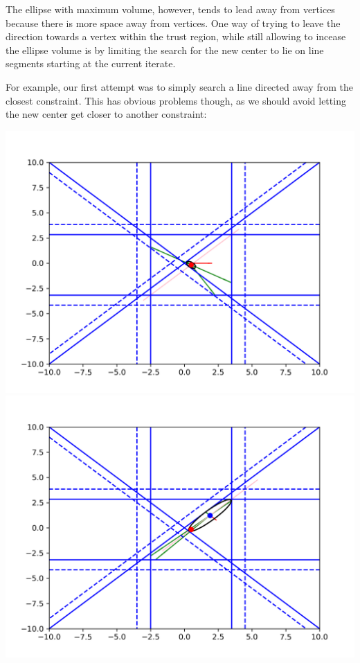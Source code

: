 \documentclass{article}
\begin{document}
The ellipse with maximum volume, however, tends to lead away from vertices because there is more space away from vertices.
One way of trying to leave the direction towards a vertex within the trust region, while still allowing to incease the ellipse volume is by limiting the search for the new center to lie on line segments starting at the current iterate.

For example, our first attempt was to simply search a line directed away from the closest constraint.
This has obvious problems though, as we should avoid letting the new center get closer to another constraint:

\includegraphics[scale=0.4]{line_1.png}
\includegraphics[scale=0.4]{line_2.png}
\end{document}
